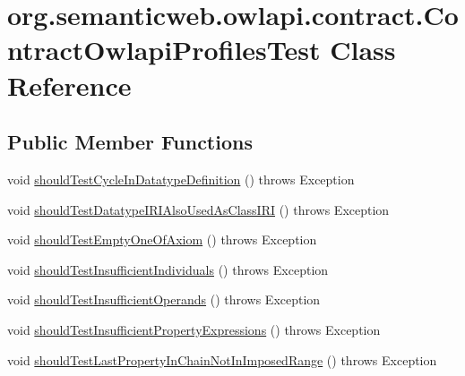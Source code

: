 \hypertarget{classorg_1_1semanticweb_1_1owlapi_1_1contract_1_1_contract_owlapi_profiles_test}{\section{org.\-semanticweb.\-owlapi.\-contract.\-Contract\-Owlapi\-Profiles\-Test Class Reference}
\label{classorg_1_1semanticweb_1_1owlapi_1_1contract_1_1_contract_owlapi_profiles_test}
}
\subsection*{Public Member Functions}
\begin{DoxyCompactItemize}
\item 
void \hyperlink{classorg_1_1semanticweb_1_1owlapi_1_1contract_1_1_contract_owlapi_profiles_test_ac889270f208dca9354574fbaea102f8a}{should\-Test\-Cycle\-In\-Datatype\-Definition} ()  throws Exception 
\item 
void \hyperlink{classorg_1_1semanticweb_1_1owlapi_1_1contract_1_1_contract_owlapi_profiles_test_a70e63339ea735ce108eb5d293fb1f627}{should\-Test\-Datatype\-I\-R\-I\-Also\-Used\-As\-Class\-I\-R\-I} ()  throws Exception 
\item 
void \hyperlink{classorg_1_1semanticweb_1_1owlapi_1_1contract_1_1_contract_owlapi_profiles_test_a9f612917183be6eafa73b1128198424d}{should\-Test\-Empty\-One\-Of\-Axiom} ()  throws Exception 
\item 
void \hyperlink{classorg_1_1semanticweb_1_1owlapi_1_1contract_1_1_contract_owlapi_profiles_test_a90793e6d6649bba6359cf40662fb3517}{should\-Test\-Insufficient\-Individuals} ()  throws Exception 
\item 
void \hyperlink{classorg_1_1semanticweb_1_1owlapi_1_1contract_1_1_contract_owlapi_profiles_test_ad6189faa83f2828e9282eca7e7dca453}{should\-Test\-Insufficient\-Operands} ()  throws Exception 
\item 
void \hyperlink{classorg_1_1semanticweb_1_1owlapi_1_1contract_1_1_contract_owlapi_profiles_test_a5289ae6c45ac4e7e244ddfbfacc49e63}{should\-Test\-Insufficient\-Property\-Expressions} ()  throws Exception 
\item 
void \hyperlink{classorg_1_1semanticweb_1_1owlapi_1_1contract_1_1_contract_owlapi_profiles_test_aefc501b8988851d6ee30177f4dad22fa}{should\-Test\-Last\-Property\-In\-Chain\-Not\-In\-Imposed\-Range} ()  throws Exception 

\end{DoxyCompactItemize}
